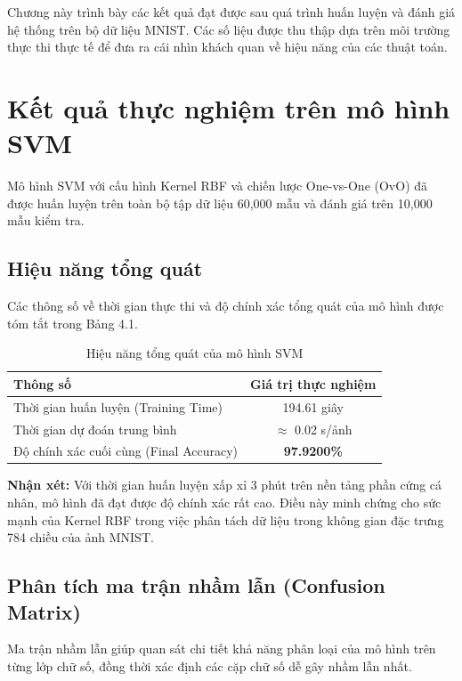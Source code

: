 \documentclass[../DoAn.tex]{subfiles}
\begin{document}
Chương này trình bày các kết quả đạt được sau quá trình huấn luyện và đánh giá hệ thống trên bộ dữ liệu MNIST. Các số liệu được thu thập dựa trên môi trường thực thi thực tế để đưa ra cái nhìn khách quan về hiệu năng của các thuật toán.

\section{Kết quả thực nghiệm trên mô hình SVM}

Mô hình SVM với cấu hình Kernel RBF và chiến lược One-vs-One (OvO) đã được huấn luyện trên toàn bộ tập dữ liệu 60,000 mẫu và đánh giá trên 10,000 mẫu kiểm tra.

\subsection{Hiệu năng tổng quát}

Các thông số về thời gian thực thi và độ chính xác tổng quát của mô hình được tóm tắt trong Bảng 4.1.

\begin{table}[H]
\centering
\caption{Hiệu năng tổng quát của mô hình SVM}
\label{tab:svm_general_perf}
\begin{tabular}{|l|c|}
\hline
\textbf{Thông số} & \textbf{Giá trị thực nghiệm} \\ \hline
Thời gian huấn luyện (Training Time) & 194.61 giây \\ \hline
Thời gian dự đoán trung bình & $\approx$ 0.02 s/ảnh \\ \hline
Độ chính xác cuối cùng (Final Accuracy) & \textbf{97.9200\%} \\ \hline
\end{tabular}
\end{table}

\textbf{Nhận xét:} Với thời gian huấn luyện xấp xỉ 3 phút trên nền tảng phần cứng cá nhân, mô hình đã đạt được độ chính xác rất cao. Điều này minh chứng cho sức mạnh của Kernel RBF trong việc phân tách dữ liệu trong không gian đặc trưng 784 chiều của ảnh MNIST.

\subsection{Phân tích ma trận nhầm lẫn (Confusion Matrix)}

Ma trận nhầm lẫn giúp quan sát chi tiết khả năng phân loại của mô hình trên từng lớp chữ số, đồng thời xác định các cặp chữ số dễ gây nhầm lẫn nhất.
\end{document}

